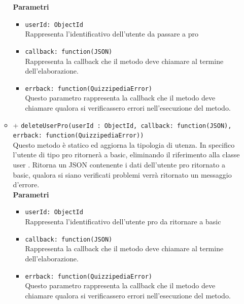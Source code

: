 \begin{itemize}
\begin{itemize}
		\textbf{Parametri} 
			\begin{itemize}
			\item
				\texttt{userId: ObjectId} \\
				Rappresenta l'identificativo dell'utente da passare a pro
			\item	
				\texttt{callback: function(JSON)} \\
				Rappresenta la callback che il metodo deve chiamare al termine dell'elaborazione.	
			\item	
				\texttt{errback: function(QuizzipediaError)} \\
				Questo parametro rappresenta la callback che il metodo deve chiamare qualora si verificassero errori nell'esecuzione del metodo.		
			\end{itemize}	
		\item	
		+ \texttt{deleteUserPro(userId : ObjectId, callback: function(JSON), errback: function(QuizzipediaError))} \\	
		Questo metodo è statico ed aggiorna la tipologia di utenza. In specifico l'utente di tipo pro ritornerà a basic, eliminando il riferimento alla classe user . Ritorna un JSON contenente i dati dell'utente pro ritornato a basic, qualora si siano verificati problemi verrà ritornato un messaggio d'errore.	\\	
		\textbf{Parametri} 
			\begin{itemize}
			\item
				\texttt{userId: ObjectId} \\
				Rappresenta l'identificativo dell'utente pro da ritornare a basic
			\item	
				\texttt{callback: function(JSON)} \\
				Rappresenta la callback che il metodo deve chiamare al termine dell'elaborazione.	
			\item	
				\texttt{errback: function(QuizzipediaError)} \\
				Questo parametro rappresenta la callback che il metodo deve chiamare qualora si verificassero errori nell'esecuzione del metodo.		
			\end{itemize}		
		\end{itemize}
		
\end{itemize}